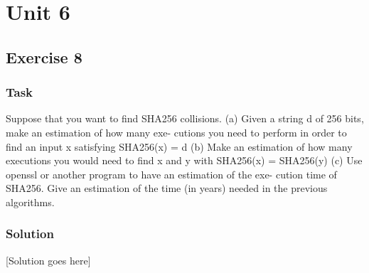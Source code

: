 \chapter{Unit 6}
\section{Exercise 8}

\subsection{Task}
Suppose that you want to find SHA256 collisions.
(a) Given a string d of 256 bits, make an estimation of how many exe-
cutions you need to perform in order to find an input x satisfying
SHA256(x) = d
(b) Make an estimation of how many executions you would need to
find x and y with SHA256(x) = SHA256(y)
(c) Use openssl or another program to have an estimation of the exe-
cution time of SHA256. Give an estimation of the time (in years)
needed in the previous algorithms.

\subsection{Solution}
[Solution goes here] 